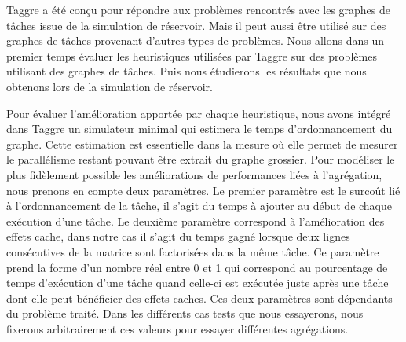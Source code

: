 Taggre a été conçu pour répondre aux problèmes rencontrés avec les graphes de tâches issue de la simulation de réservoir.
%
Mais il peut aussi être utilisé sur des graphes de tâches provenant d'autres types de problèmes.
%
Nous allons dans un premier temps évaluer les heuristiques utilisées par Taggre sur des problèmes utilisant des graphes de tâches.
%
Puis nous étudierons les résultats que nous obtenons lors de la simulation de réservoir.


Pour évaluer l'amélioration apportée par chaque heuristique, nous avons intégré dans Taggre un simulateur minimal qui estimera le temps d'ordonnancement du graphe.
%
Cette estimation est essentielle dans la mesure où elle permet de mesurer le parallélisme restant pouvant être extrait du graphe grossier.
%
Pour modéliser le plus fidèlement possible les améliorations de performances liées à l'agrégation, nous prenons en compte deux paramètres.
%
Le premier paramètre est le surcoût lié à l'ordonnancement de la tâche, il s'agit du temps à ajouter au début de chaque exécution d'une tâche.
%
Le deuxième paramètre correspond à l'amélioration des effets cache, dans notre cas il s'agit du temps gagné lorsque deux lignes consécutives de la matrice sont factorisées dans la même tâche.
%
Ce paramètre prend la forme d'un nombre réel entre 0 et 1 qui correspond au pourcentage de temps d'exécution d'une tâche quand celle-ci est exécutée juste après une tâche dont elle peut bénéficier des effets caches.
%
Ces deux paramètres sont dépendants du problème traité.
%
Dans les différents cas tests que nous essayerons, nous fixerons arbitrairement ces valeurs pour essayer différentes agrégations.

